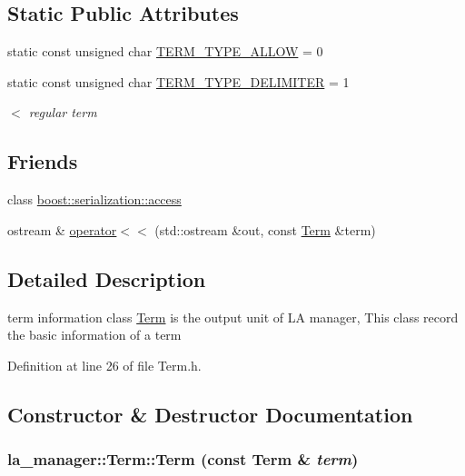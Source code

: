 \subsection*{Static Public Attributes}
\begin{CompactItemize}
\item 
static const unsigned char \hyperlink{classla__manager_1_1Term_ec1b1555fbf13256b27fdb0903327704}{TERM\_\-TYPE\_\-ALLOW} = 0
\item 
static const unsigned char \hyperlink{classla__manager_1_1Term_f7e0c80b4fb0bb1f9b49730475ea55b6}{TERM\_\-TYPE\_\-DELIMITER} = 1
\begin{CompactList}\small\item\em $<$ regular term \item\end{CompactList}\end{CompactItemize}
\subsection*{Friends}
\begin{CompactItemize}
\item 
class \hyperlink{classla__manager_1_1Term_c98d07dd8f7b70e16ccb9a01abf56b9c}{boost::serialization::access}
\item 
ostream \& \hyperlink{classla__manager_1_1Term_196eef2ccb3aef372d8c673c85d3bb02}{operator$<$$<$} (std::ostream \&out, const \hyperlink{classla__manager_1_1Term}{Term} \&term)
\end{CompactItemize}


\subsection{Detailed Description}
term information class \hyperlink{classla__manager_1_1Term}{Term} is the output unit of LA manager, This class record the basic information of a term 

Definition at line 26 of file Term.h.

\subsection{Constructor \& Destructor Documentation}
\hypertarget{classla__manager_1_1Term_7f92bddd0d409bd0c9318264f75b9ce5}{
\subsubsection[{Term}]{\setlength{\rightskip}{0pt plus 5cm}la\_\-manager::Term::Term (const {\bf Term} \& {\em term})}}
\label{classla__manager_1_1Term_7f92bddd0d409bd0c9318264f75b9ce5}




